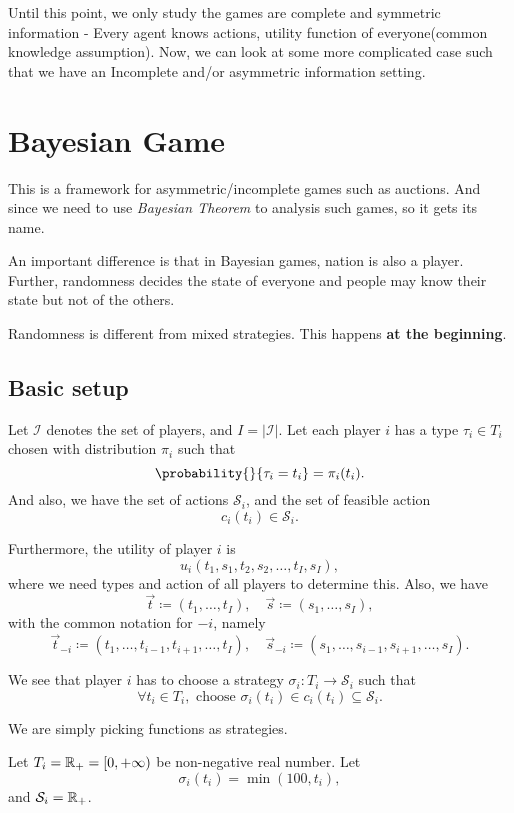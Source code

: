 \hr

Until this point, we only study the games are complete and symmetric information - Every agent knows actions, utility function of everyone(common knowledge assumption).
Now, we can look at some more complicated case such that we have an Incomplete and/or asymmetric information setting.

\section{Bayesian Game}
This is a framework for asymmetric/incomplete games such as auctions. And since we need to use \emph{Bayesian Theorem} to analysis such games, so
it gets its name.

An important difference is that in Bayesian games, nation is also a player. Further, randomness decides the state of everyone and people may
know their state but not of the others.

\begin{note}
	Randomness is different from mixed strategies. This happens \textbf{at the beginning}.
\end{note}

\subsection{Basic setup}
Let \(\mathcal{I} \) denotes the set of players, and \(I = \left\vert \mathcal{I}  \right\vert \). Let each player \(i\) has a type
\(\tau_{i}\in T_{i}\) chosen with distribution \(\pi_i\) such that
\[
	\probability{}{\tau_{i} = t_{i}} = \pi_i(t_{i}) .
\]
And also, we have the set of actions \(\mathcal{S}_{i}\), and the set of feasible action
\[
	c_{i}(t_{i})\in \mathcal{S}_{i}.
\]

Furthermore, the utility of player \(i\) is
\[
	u_{i}(t_1, s_1, t_2, s_2, \ldots , t_I, s_I),
\]
where we need types and action of all players to determine this. Also, we have
\[
	\vec{t}\coloneqq (t_1, \ldots , t_I),\quad \vec{s} \coloneqq (s_1, \ldots , s_I),
\]
with the common notation for \(-i\), namely
\[
	\vec{t}_{-i} \coloneqq (t_1, \ldots , t_{i-1}, t_{i+1}, \ldots , t_{I}),\quad \vec{s}_{-i} \coloneqq (s_1, \ldots , s_{i-1}, s_{i+1}, \ldots , s_{I}).
\]

We see that player \(i\) has to choose a strategy \(\sigma_{i}\colon T_{i}\to \mathcal{S}_{i}\) such that
\[
	\forall t_{i}\in T_{i}, \text{ choose }\sigma_{i}(t_{i})\in c_{i}(t_{i})\subseteq \mathcal{S}_{i}.
\]
\begin{intuition}
	We are simply picking functions as strategies.
\end{intuition}
\begin{eg}
	Let \(T_{i} = \mathbb{\MakeUppercase{R}}_+ = [0, +\infty )\) be non-negative real number. Let
	\[
		\sigma_{i}(t_{i}) = \min(100, t_{i}),
	\]
	and \(\mathcal{S}_{i} = \mathbb{\MakeUppercase{R}}_+\).

	\begin{figure}[H]
		\centering
		\label{fig:action-function-eg}
	\end{figure}
\end{eg}

